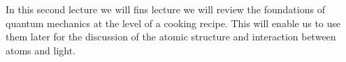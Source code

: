In this second lecture we will fins lecture we will review the foundations of quantum mechanics at the level of a cooking recipe. This will enable us to use them later for the discussion of the atomic structure and interaction between atoms and light.